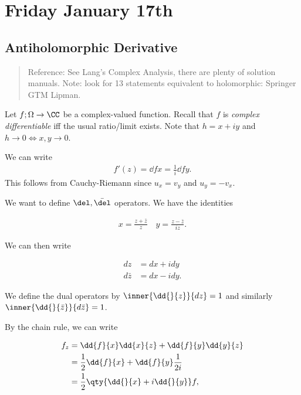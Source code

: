 \hypertarget{friday-january-17th}{%
\section{Friday January 17th}\label{friday-january-17th}}

\hypertarget{antiholomorphic-derivative}{%
\subsection{Antiholomorphic
Derivative}\label{antiholomorphic-derivative}}

\begin{quote}
Reference: See Lang's Complex Analysis, there are plenty of solution
manuals. Note: look for 13 statements equivalent to holomorphic:
Springer GTM Lipman.
\end{quote}

Let \(f; \Omega \to \CC\) be a complex-valued function. Recall that
\(f\) is \emph{complex differentiable} iff the usual ratio/limit exists.
Note that \(h = x+iy\) and \(h\to 0 \iff x,y\to 0\).

We can write
\begin{align*}f'(z) = \dd{f}{x} = \frac 1 i \dd{f}{y}.\end{align*} This
follows from Cauchy-Riemann since \(u_x = v_y\) and \(u_y = -v_x\).

We want to define \(\del, \bar \del\) operators. We have the identities

\begin{align*}
x = \frac{z + \bar z}{z} \quad y = \frac{z - \bar z}{iz}
.\end{align*}

We can then write

\begin{align*}
dz &= dx + idy \\
d\bar z &= dx - i dy
.\end{align*}

We define the dual operators by \(\inner{\dd{}{z}}{dz} = 1\) and
similarly \(\inner{ \dd{}{\bar z} }{d\bar z} = 1\).

By the chain rule, we can write

\begin{align*}
f_z &= \dd{f}{x} \dd{x}{z} +  \dd{f}{y} \dd{y}{z} \\
&= \frac 1 2 \dd{f}{x} + \dd{f}{y} \frac{1}{2i} \\
&= \frac 1 2 \qty{\dd{}{x} + i \dd{}{y} }f 
,\end{align*}

